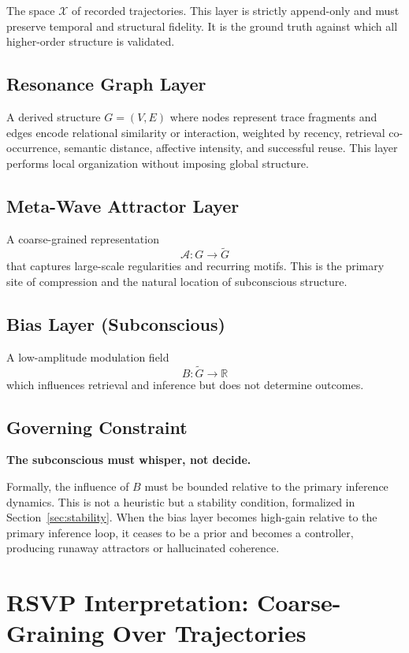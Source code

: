 \documentclass[12pt,a4paper]{article}
\begin{document}
The space $\mathcal{X}$ of recorded trajectories. This layer is strictly append-only and must preserve temporal and structural fidelity. It is the ground truth against which all higher-order structure is validated.

\subsection{Resonance Graph Layer}

A derived structure $G = (V, E)$ where nodes represent trace fragments and edges encode relational similarity or interaction, weighted by recency, retrieval co-occurrence, semantic distance, affective intensity, and successful reuse. This layer performs local organization without imposing global structure.

\subsection{Meta-Wave Attractor Layer}

A coarse-grained representation
\[
\mathcal{A} : G \rightarrow \tilde{G}
\]
that captures large-scale regularities and recurring motifs. This is the primary site of compression and the natural location of subconscious structure.

\subsection{Bias Layer (Subconscious)}

A low-amplitude modulation field
\[
B : \tilde{G} \rightarrow \mathbb{R}
\]
which influences retrieval and inference but does not determine outcomes.

\subsection{Governing Constraint}

\textbf{The subconscious must whisper, not decide.}

Formally, the influence of $B$ must be bounded relative to the primary inference dynamics. This is not a heuristic but a stability condition, formalized in Section~\ref{sec:stability}. When the bias layer becomes high-gain relative to the primary inference loop, it ceases to be a prior and becomes a controller, producing runaway attractors or hallucinated coherence.

\section{RSVP Interpretation: Coarse-Graining Over Trajectories}
\label{sec:rsvp}
\end{document}
